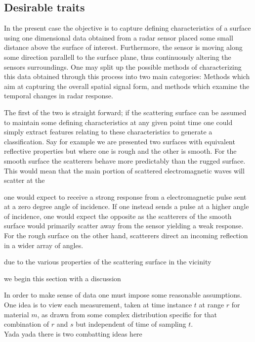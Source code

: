 \documentclass[a4paper, 12pt]{article}
\begin{document}
\subsection{Desirable traits}

In the present case the objective is to capture defining characteristics of a surface using one dimensional data obtained from a radar sensor placed some small distance above the surface of interest. Furthermore, the sensor is moving along some direction parallell to the surface plane, thus continuously altering the sensors surroundings. One may split up the possible methods of characterizing this data obtained through this process into two main categories: Methods which aim at capturing the overall spatial signal form, and methods which examine the temporal changes in radar response. 

The first of the two is straight forward; if the scattering surface can be assumed to maintain some defining characteristics at any given point time one could simply extract features relating to these characteristics to generate a classification. Say for example we are presented two surfaces with equivalent reflective properties but where one is rough and the other is smooth. For the smooth surface the scatterers behave more predictably than the rugged surface. This would mean that the main portion of scattered electromagnetic waves will scatter at the

one would expect to receive a strong response from a electromagnetic pulse sent at a zero degree angle of incidence. If one instead sends a pulse at a higher angle of incidence, one would expect the opposite as the scatterers of the smooth surface would primarily scatter away from the sensor yielding a weak response. For the rough surface on the other hand, scatterers direct an incoming reflection in a wider array of angles. 



due to the various properties of the scattering surface in the vicinity 

we begin this section with a discussion 



In order to make sense of data one must impose some reasonable assumptions. 
\\ 
One idea is to view each measurement, taken at time instance $t$ at range $r$ for material $m$, as drawn from some 
complex distribution specific for that combination of $r$ and $s$ but independent of time of sampling $t$. 
\\
Yada yada there is two combatting ideas here
\end{document}
